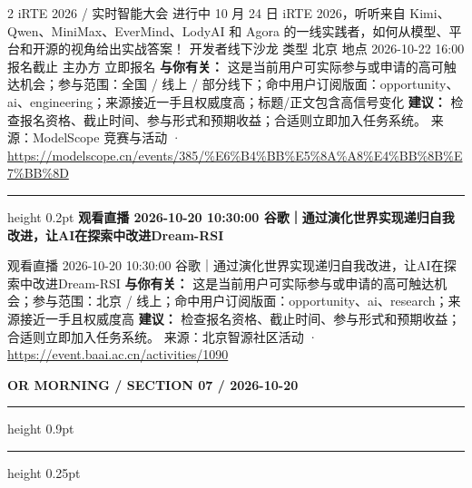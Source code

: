 \documentclass[10.5pt]{ctexart}
\begin{document}
\begin{multicols}{2}
iRTE 2026 / 实时智能大会 进行中 10 月 24 日 iRTE 2026，听听来自 Kimi、Qwen、MiniMax、EverMind、LodyAI 和 Agora 的一线实践者，如何从模型、平台和开源的视角给出实战答案！ 开发者线下沙龙 类型 北京 地点 2026-10-22 16:00 报名截止 主办方 立即报名
\textbf{与你有关：} 这是当前用户可实际参与或申请的高可触达机会；参与范围：全国 / 线上 / 部分线下；命中用户订阅版面：opportunity、ai、engineering；来源接近一手且权威度高；标题/正文包含高信号变化
\textbf{建议：} 检查报名资格、截止时间、参与形式和预期收益；合适则立即加入任务系统。
{\footnotesize\color{ormuted} 来源：ModelScope 竞赛与活动 · \url{https://modelscope.cn/events/385/%E6%B4%BB%E5%8A%A8%E4%BB%8B%E7%BB%8D}}
\vspace{2mm}
\hrule height 0.2pt
\vspace{2mm}
{\large\bfseries 观看直播 2026-10-20 10:30:00 谷歌｜通过演化世界实现递归自我改进，让AI在探索中改进Dream-RSI}\par
观看直播 2026-10-20 10:30:00 谷歌｜通过演化世界实现递归自我改进，让AI在探索中改进Dream-RSI
\textbf{与你有关：} 这是当前用户可实际参与或申请的高可触达机会；参与范围：北京 / 线上；命中用户订阅版面：opportunity、ai、research；来源接近一手且权威度高
\textbf{建议：} 检查报名资格、截止时间、参与形式和预期收益；合适则立即加入任务系统。
{\footnotesize\color{ormuted} 来源：北京智源社区活动 · \url{https://event.baai.ac.cn/activities/1090}}
\end{multicols}
\newpage
{\small\bfseries OR MORNING / SECTION 07 / 2026-10-20}
\vspace{2mm}
\hrule height 0.9pt
\vspace{1.5mm}
\hrule height 0.25pt
\vspace{4mm}
\end{document}
